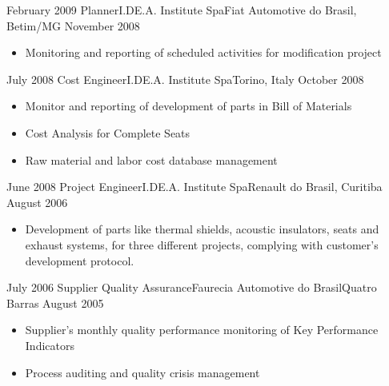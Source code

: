 \begin{experiences}
  \emptySeparator
  \experience
  {February 2009}       {Planner}{I.DE.A. Institute Spa}{Fiat Automotive do Brasil, Betim/MG}
  {November 2008}   {
                        \begin{itemize}
                            \item Monitoring and reporting of scheduled activities for modification project                       
                        \end{itemize}
                    }
                
  \emptySeparator
  \experience
  {July 2008}      {Cost Engineer}{I.DE.A. Institute Spa}{Torino, Italy}
  {October 2008}       {
                      \begin{itemize}
                          \item Monitor and reporting of development of parts in Bill of Materials
                          \item Cost Analysis for Complete Seats
                          \item Raw material and labor cost database management
                      \end{itemize}
                    }
                
  \emptySeparator   
  \experience
  {June 2008}    {Project Engineer}{I.DE.A. Institute Spa}{Renault do Brasil, Curitiba}
  {August 2006}    {
                      \begin{itemize}
                          \item Development of parts like thermal shields, acoustic insulators, seats and exhaust systems, for three different projects, complying with customer's development protocol. 
                      \end{itemize}
                
                    }
                    
  \emptySeparator            
  \experience
  {July 2006}    {Supplier Quality Assurance}{Faurecia Automotive do Brasil}{Quatro Barras}
  {August 2005}  {
                      \begin{itemize}
                        \item Supplier's monthly quality performance monitoring of Key Performance Indicators
                        \item Process auditing and quality crisis management
                      \end{itemize}
                    }
                
  \emptySeparator
\end{experiences}
